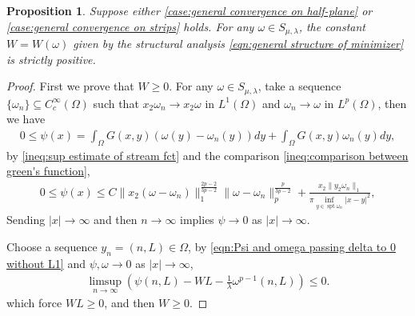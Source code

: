 \documentclass[11pt,letterpaper]{amsart}
\newtheorem{prop}[thm]{Proposition}
\theoremstyle{definition}
\theoremstyle{remark}
\renewcommand{\S}{\mathcal{S}}
\newcommand{\R}{\mathbb{R}}
\renewcommand{\O}{\Omega}
\newcommand{\spt}{\operatorname{spt}}
\numberwithin{equation}{section}
\begin{document}
\begin{prop}\label{prop:positive W}
    Suppose either \ref{case:general convergence on half-plane} or \ref{case:general convergence on strips} holds.
    For any $\omega\in S_{\mu,\lambda}$, the constant $W=W(\omega)$ given by the structural analysis \eqref{eqn:general structure of minimizer} is strictly positive.
\end{prop}
\begin{proof}
    First we prove that $W\ge0$. For any $\omega\in S_{\mu,\lambda}$, take a sequence $\{\omega_n\}\subseteq C_c^\infty(\O)$ such that $x_2\omega_n\to x_2\omega$ in $L^1(\O)$ and $\omega_n\to \omega$ in $L^p(\O)$, then we have 
    \begin{align*}
        0\leq \psi(x)= \int_{\O}G(x,y)\left( \omega(y)-\omega_n(y) \right)dy + \int_{\O}G(x,y)\omega_n(y) dy,
    \end{align*}
    by \eqref{ineq:sup estimate of stream fct} and the comparison \eqref{ineq:comparison between green's function},
    \begin{align*}
        0\leq \psi(x)\leq C \|x_2(\omega - \omega_n)\|_1^{\frac{2p-2}{3p-2}}\|\omega-\omega_n\|_p^{\frac{p}{3p-2}} + \frac{x_2\|y_2\omega_n\|_1}{\pi \inf_{y\in \spt\omega_n}|x-y|^2} ,
    \end{align*}
    Sending $|x|\to \infty$ and then $n\to \infty$ implies $\psi\to 0 $ as $|x| \to \infty$. 
    
    Choose a sequence $y_n=(n,L)\in \O $, by \eqref{eqn:Psi and omega passing delta to 0 without L1} and $\psi, \omega \to 0$ as $|x|\to \infty$,
    \begin{align*}
        \limsup_{n\to \infty} \left( \psi(n,L)-WL - \frac{1}{\lambda}\omega^{p-1}(n,L) \right) \leq 0.
    \end{align*}
    which force $WL \geq 0$, and then $W\geq 0$.


\end{proof}
\end{document}
